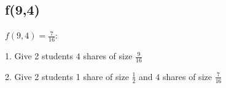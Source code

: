 \documentclass[a4paper]{article}
\begin{document}
\subsection{f(9,4)}
\hspace{4ex}
$f(9,4) = \frac{7}{16}$:

\noindent
\hspace{4ex}
1. Give 2 students $4$ shares of size $\frac{9}{16}$

\noindent
\hspace{4ex}
2. Give 2 students 1 share of size $\frac{1}{2}$ and $4$ shares of size $\frac{7}{16}$
\end{document}
